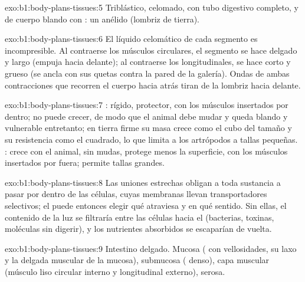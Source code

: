\begin{solution}{exo:b1:body-plans-tissues:5}
Triblástico, celomado, con tubo digestivo completo,  y de cuerpo
blando con : un anélido (lombriz de tierra).
\end{solution}

\begin{solution}{exo:b1:body-plans-tissues:6}
El líquido celomático de cada segmento es incompresible. Al contraerse los
músculos circulares, el segmento se hace delgado y largo (empuja hacia
delante); al contraerse los longitudinales, se hace corto y grueso (se ancla
con sus quetas contra la pared de la galería). Ondas de ambas contracciones
que recorren el cuerpo hacia atrás tiran de la lombriz hacia delante.
\end{solution}

\begin{solution}{exo:b1:body-plans-tissues:7}
: rígido, protector, con los músculos insertados por dentro; no
puede crecer, de modo que el animal debe mudar y queda blando y vulnerable
entretanto; en tierra firme su masa crece como el cubo del tamaño y su
resistencia como el cuadrado, lo que limita a los artrópodos a tallas
pequeñas. : crece con el animal, sin mudas, protege menos la
superficie, con los músculos insertados por fuera; permite tallas grandes.
\end{solution}

\begin{solution}{exo:b1:body-plans-tissues:8}
Las uniones estrechas obligan a toda sustancia a pasar por dentro de las
células, cuyas membranas llevan transportadores selectivos; el 
puede entonces elegir qué atraviesa y en qué sentido. Sin ellas, el
contenido de la luz se filtraría entre las células hacia el 
(bacterias, toxinas, moléculas sin digerir), y los nutrientes absorbidos se
escaparían de vuelta.
\end{solution}

\begin{solution}{exo:b1:body-plans-tissues:9}
Intestino delgado. Mucosa ( con vellosidades, su 
laxo y la delgada muscular de la mucosa), submucosa (
denso), capa muscular (músculo liso circular interno y longitudinal
externo), serosa.
\end{solution}

